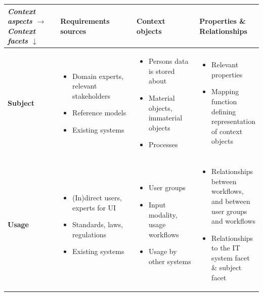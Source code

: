 \documentclass{article}
\begin{document}
\begin{adjustbox}{center}
\begin{tabular}{p{0.3\linewidth}|p{0.4\linewidth}|p{0.4\linewidth}|p{0.4\linewidth}|}
\centering
\pbox{20cm}{\textbf{\textit{Context aspects $\rightarrow$}} \\ \textbf{\textit{Context facets $\downarrow$}}}& \textbf{Requirements sources} & \textbf{Context objects} & \textbf{Properties \& Relationships}\\ \hline
\vspace{1.2cm}\textbf{Subject} & 
\begin{itemize}[leftmargin=*] 
\item Domain experts, relevant stakeholders 
\item Reference models 
\item Existing systems 
\end{itemize} & 
\begin{itemize}[leftmargin=*] 
\item Persons data is stored about \item Material objects, immaterial objects \item Processes 
\end{itemize} & 
\begin{itemize}[leftmargin=*] 
\item Relevant properties
\item Mapping function defining representation of context objects
\end{itemize}  \\ \hline
\vspace{1.2cm}\textbf{Usage} & 
\begin{itemize}[leftmargin=*] 
\item (In)direct users, experts for UI
\item Standards, laws, regulations
\item Existing systems 
\end{itemize}
& 
\begin{itemize}[leftmargin=*] 
\item User groups
\item Input modality, usage workflows
\item Usage by other systems
\end{itemize}
&  
\begin{itemize}[leftmargin=*] 
\item Relationships between workflows, and between user groups and workflows
\item Relationships to the IT system facet \& subject facet

\end{itemize}
\end{tabular}
\end{adjustbox}
\end{document}
